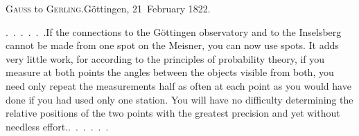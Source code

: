 \begin{center}
\textsc{Gauss} to \textsc{Gerling}.\quad Göttingen, 21~February 1822.
\end{center}

\par\noindent\hspace*{\parindent}\mbox{.\ .\ .\ .\ .\ .}\quad If the connections to the Göttingen observatory and to the Inselsberg cannot be made from one spot on the Meisner, you can now use  spots.
It adds very little work, for according to the principles of probability theory, if you measure at both points the angles between the objects visible from both, you need only repeat the measurements half as often at each point as you would have done if you had used only one station.
You will have no difficulty determining the relative positions of the two points with the greatest precision and yet without needless \mbox{effort.\quad.\ .\ .\ .\ .\ .}
